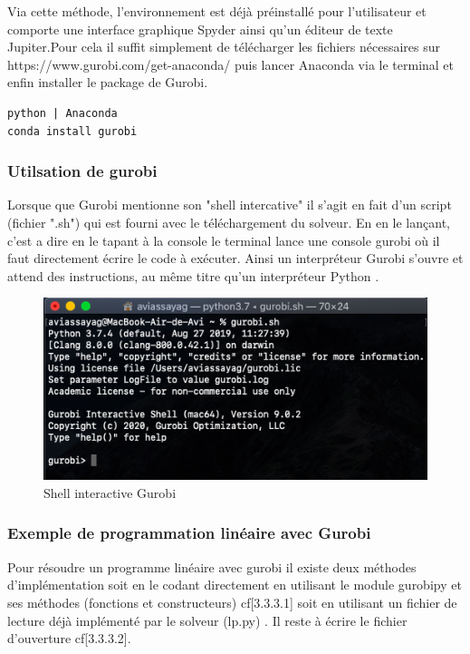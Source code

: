 \documentclass[a4paper, 12pt, twoside]{article}
\begin{document}
Via cette méthode, l'environnement est déjà préinstallé pour l'utilisateur et comporte une interface graphique \textsf{Spyder} ainsi qu'un éditeur de texte \textsf{Jupiter}.Pour cela il suffit simplement de télécharger les fichiers nécessaires sur https://www.gurobi.com/get-anaconda/ puis lancer \textsf{Anaconda} via le terminal et enfin installer le package de \textsf{Gurobi}.
\begin{verbatim}
python | Anaconda
conda install gurobi 
\end{verbatim}


\subsubsection{Utilsation de gurobi}
Lorsque que \textsf{Gurobi} mentionne son "shell intercative" il s'agit en fait d'un script (fichier ".sh") qui est fourni avec le téléchargement du solveur. En en le lançant, c'est a dire en le tapant à  la console le terminal lance une console \textsf{gurobi} où il faut directement écrire le code à exécuter. Ainsi un interpréteur \textsf{Gurobi} s'ouvre et attend des instructions, au même titre qu'un interpréteur \textsf{Python} .
\begin{center}
\begin{figure}[h!]
\centering
\includegraphics[scale=0.8]{console.png}
\caption{Shell interactive Gurobi }
\end{figure}
\end{center}

\subsubsection{Exemple de programmation linéaire avec Gurobi}
Pour résoudre un programme linéaire avec \textsf{gurobi} il existe deux méthodes d'implémentation soit en le codant directement en utilisant le module \textsf{gurobipy} et ses méthodes (fonctions et constructeurs) cf[3.3.3.1] soit  en utilisant un fichier de lecture déjà implémenté par le solveur (lp.py) . Il reste à écrire le fichier d'ouverture cf[3.3.3.2].
\end{document}
